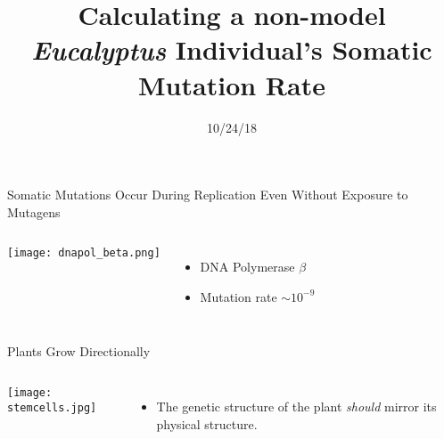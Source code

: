 \documentclass{beamer}
\title[Eucalyptus Somatic Mutation]{Calculating a non-model \textit{Eucalyptus} Individual's Somatic Mutation Rate}
\date{10/24/18}
\author{Adam Orr\hskip 1em \faicon{twitter}@AdamJOrr}
\begin{document}
\frame{\titlepage}


\begin{frame}{Somatic Mutations Occur During Replication Even Without Exposure to Mutagens}
\begin{columns}
		\texttt{[image: dnapol\_beta.png]}
		\begin{itemize}
			\item DNA Polymerase $\beta$
			\item Mutation rate $\sim10^{-9}$
		\end{itemize}
		\vskip 3in
\end{columns}
\end{frame}

\begin{frame}{Plants Grow Directionally}
\begin{columns}
		\texttt{[image: stemcells.jpg]}
		\begin{itemize}
			\item The genetic structure of the plant \textit{should} mirror its physical structure.
		\end{itemize}
\end{columns}
\end{frame}
\end{document}
